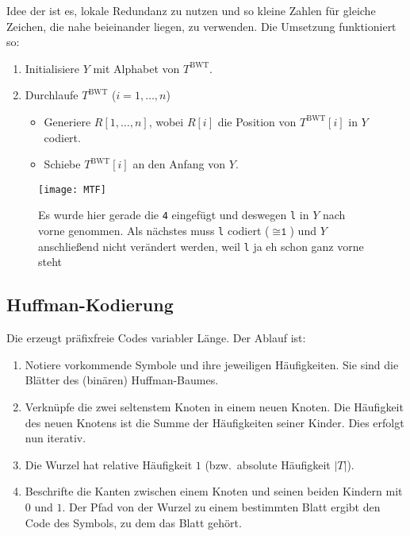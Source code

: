 Idee der  ist es, lokale Redundanz zu nutzen und so kleine Zahlen für gleiche Zeichen, die nahe beieinander liegen, zu verwenden. Die Umsetzung funktioniert so:

\begin{enumerate}
  \item Initialisiere \( Y \) mit Alphabet von \( T^{\text{BWT}} \).
  \item Durchlaufe \( T^{\text{BWT}} \) (\( i = 1,\dots,n \))
  \begin{itemize}
    \item Generiere \( R[1,\dots,n] \), wobei \( R[i] \) die Position von \( T^{\text{BWT}}[i] \) in \( Y \) codiert.
    \item Schiebe \( T^{\text{BWT}}[i] \) an den Anfang von \( Y \).
  \end{itemize}
\end{enumerate}

\begin{figure}[H]
  \texttt{[image: MTF]}
  \caption{Es wurde hier gerade die \texttt{4} eingefügt und deswegen \texttt{l} in \( Y \) nach vorne genommen. Als nächstes muss \texttt{l} codiert (\( \cong \texttt{1} \)) und \( Y \) anschließend nicht verändert werden, weil \texttt{l} ja eh schon ganz vorne steht}
\end{figure}

\subsection{Huffman-Kodierung}

Die  erzeugt präfixfreie Codes variabler Länge. Der Ablauf ist:

\begin{enumerate}
  \item Notiere vorkommende Symbole und ihre jeweiligen Häufigkeiten. Sie sind die Blätter des (binären) Huffman-Baumes.
  \item Verknüpfe die zwei seltenstem Knoten in einem neuen Knoten. Die Häufigkeit des neuen Knotens ist die Summe der Häufigkeiten seiner Kinder. Dies erfolgt nun iterativ.
  \item Die Wurzel hat relative Häufigkeit \( 1 \) (bzw.\ absolute Häufigkeit \( \left\vert T \right\vert \)).
  \item Beschrifte die Kanten zwischen einem Knoten und seinen beiden Kindern mit \( 0 \) und \( 1 \). Der Pfad von der Wurzel zu einem bestimmten Blatt ergibt den Code des Symbols, zu dem das Blatt gehört.
\end{enumerate}

